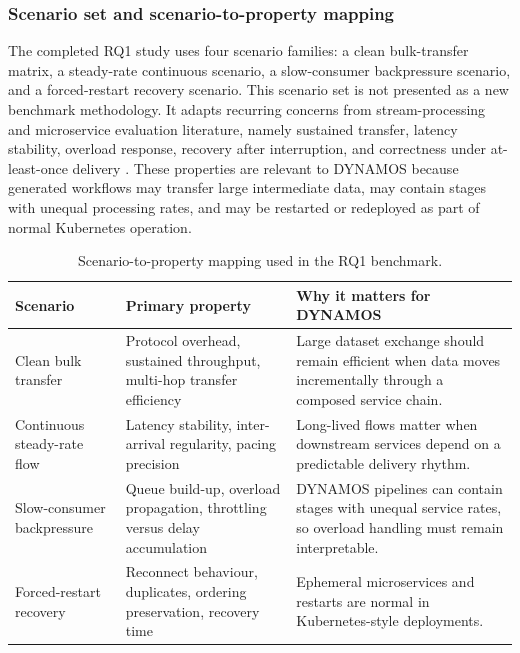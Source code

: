 \subsubsection{Scenario set and scenario-to-property mapping}

The completed RQ1 study uses four scenario families: a clean bulk-transfer matrix, a steady-rate continuous scenario, a slow-consumer backpressure scenario, and a forced-restart recovery scenario. This scenario set is not presented as a new benchmark methodology. It adapts recurring concerns from stream-processing and microservice evaluation literature, namely sustained transfer, latency stability, overload response, recovery after interruption, and correctness under at-least-once delivery \cite{karimov2018benchmarking,systematicstreaming,ciftci2025ipcmechanisms,vogel2024faultRecovery}. These properties are relevant to DYNAMOS because generated workflows may transfer large intermediate data, may contain stages with unequal processing rates, and may be restarted or redeployed as part of normal Kubernetes operation.

\begin{table}[!t]
    \centering
    \footnotesize
    \caption{Scenario-to-property mapping used in the RQ1 benchmark.}
    \label{tab:phase1-scenario-map}
    \setlength{\tabcolsep}{5pt}
    \begin{tabular}{p{}p{}p{}}
        \toprule
        Scenario & Primary property & Why it matters for DYNAMOS \\
        \midrule
        Clean bulk transfer & Protocol overhead, sustained throughput, multi-hop transfer efficiency & Large dataset exchange should remain efficient when data moves incrementally through a composed service chain. \\
        Continuous steady-rate flow & Latency stability, inter-arrival regularity, pacing precision & Long-lived flows matter when downstream services depend on a predictable delivery rhythm. \\
        Slow-consumer backpressure & Queue build-up, overload propagation, throttling versus delay accumulation & DYNAMOS pipelines can contain stages with unequal service rates, so overload handling must remain interpretable. \\
        Forced-restart recovery & Reconnect behaviour, duplicates, ordering preservation, recovery time & Ephemeral microservices and restarts are normal in Kubernetes-style deployments. \\
        \bottomrule
    \end{tabular}
\end{table}

